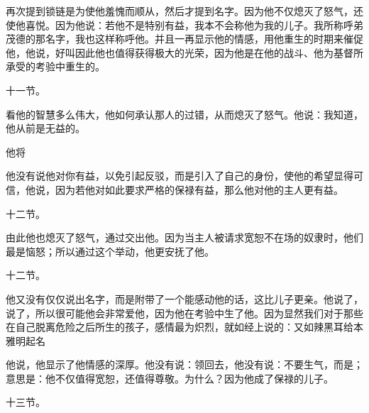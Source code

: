 再次提到锁链是为使他羞愧而顺从，然后才提到名字。因为他不仅熄灭了怒气，还使他喜悦。因为他说：若他不是特别有益，我本不会称他为我的儿子。我所称呼弟茂德的那名字，我也这样称呼他。并且一再显示他的情感，用他重生的时期来催促他，他说，好叫因此他也值得获得极大的光荣，因为他是在他的战斗、他为基督所承受的考验中重生的。\par

\par

十一节。 \par

看他的智慧多么伟大，他如何承认那人的过错，从而熄灭了怒气。他说：我知道，他从前是无益的。\par

他将\par

他没有说他对你有益，以免引起反驳，而是引入了自己的身份，使他的希望显得可信，他说，因为若他对如此要求严格的保禄有益，那么他对他的主人更有益。\par

十二节。 \par

由此他也熄灭了怒气，通过交出他。因为当主人被请求宽恕不在场的奴隶时，他们最是恼怒；所以通过这个举动，他更安抚了他。\par

十二节。 \par

他又没有仅仅说出名字，而是附带了一个能感动他的话，这比儿子更亲。他说了，说了，所以很可能他会非常爱他，因为他在考验中生了他。因为显然我们对于那些在自己脱离危险之后所生的孩子，感情最为炽烈，就如经上说的：又如辣黑耳给本雅明起名 \par

他说，他显示了他情感的深厚。他没有说：领回去，他没有说：不要生气，而是；意思是：他不仅值得宽恕，还值得尊敬。为什么？因为他成了保禄的儿子。\par

十三节。 \par

